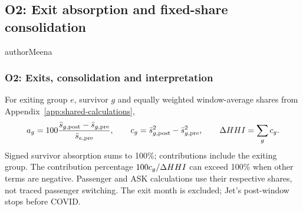 \subsection{O2: Exit absorption and fixed-share consolidation}
\begin{mergedcontribution}{authorMeena}
\subsubsection{O2: Exits, consolidation and interpretation}
\label{app:o2-definitions}
For exiting group $e$, survivor $g$ and equally weighted window-average shares from Appendix~\ref{app:shared-calculations},
\[
a_g=100\frac{\bar s_{g,\mathrm{post}}-\bar s_{g,\mathrm{pre}}}{\bar s_{e,\mathrm{pre}}},\qquad
c_g=\bar s_{g,\mathrm{post}}^2-\bar s_{g,\mathrm{pre}}^2,\qquad
\Delta HHI=\sum_g c_g.
\]
Signed survivor absorption sums to 100\%; contributions include the exiting group. The contribution percentage $100c_g/\Delta HHI$ can exceed 100\% when other terms are negative. Passenger and ASK calculations use their respective shares, not traced passenger switching. The exit month is excluded; Jet's post-window stops before COVID.


\end{mergedcontribution}
